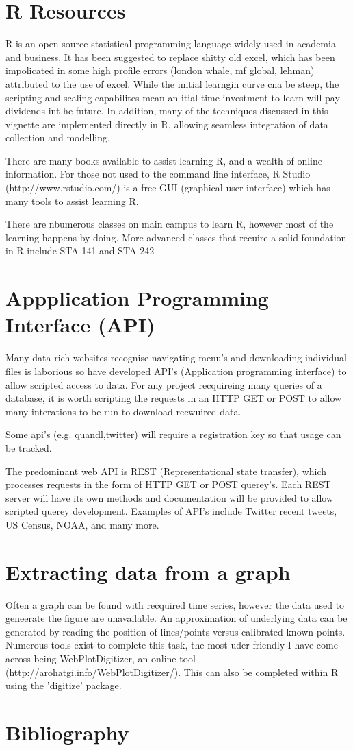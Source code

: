 \documentclass[11pt]{article}
\begin{document}
\section{R Resources} \label{app:mod}
	R is an open source statistical programming language widely used in academia and business.
	It has been suggested to replace shitty old excel, which has been impolicated in some high profile errors (london whale, mf global, lehman) attributed to the use of excel\cite{excel13}.
	While the initial learngin curve cna be steep, the scripting and scaling capabilites mean an itial time investment to learn will pay dividends int he future.
	In addition, many of the techniques discussed in this vignette are implemented directly in R, allowing seamless integration of data collection and modelling.


	There are many books available to assist learning R, and a wealth of online information. 
	For those not used to the command line interface, R Studio (http://www.rstudio.com/) is a free GUI (graphical user interface) which has many tools to assist learning R.

	There are nbumerous classes on main campus to learn R, however most of the learning happens by doing.
	More advanced classes that recuire a solid foundation in R include STA 141 and STA 242


	\section{Appplication Programming Interface (API)}\label{api}
	Many data rich websites recognise navigating menu's and downloading individual files is laborious so have developed API's (Application programming interface) to allow scripted access to data.
	For any project recquireing many queries of a database, it is worth scripting the requests in an HTTP GET or POST to allow many interations to be run to download recwuired data.

	Some api's (e.g. quandl,twitter) will require a registration key so that usage can be tracked.


	The predominant web API is REST (Representational state transfer), which processes requests in the form of HTTP GET or POST querey's.
	Each REST server will have its own methods and documentation will be provided to allow scripted querey development.
	Examples of API's include Twitter recent tweets, US Census, NOAA, and many more.


	\section{Extracting data from a graph}\label{graph}
	Often a graph can be found with recquired time series, however the data used to geneerate the figure are unavailable.
	An approximation of underlying data can be generated by reading the position of lines/points versus calibrated known points. 
	Numerous tools exist to complete this task, the most uder friendly I have come across being WebPlotDigitizer, an online tool (http://arohatgi.info/WebPlotDigitizer/). 
	This can also be completed within R using the 'digitize' package.

\newpage
\section{Bibliography}


\end{document}
